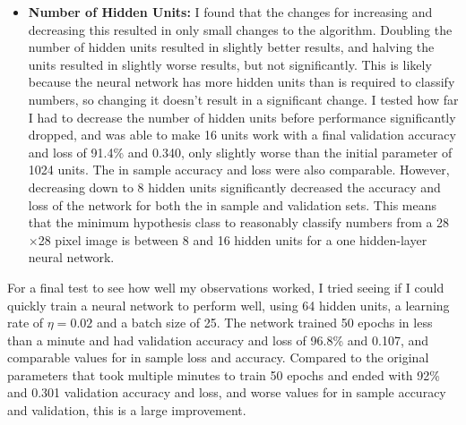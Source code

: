 \documentclass{article}
\begin{document}
\begin{itemize}
	\item \textbf{Number of Hidden Units:} I found that the changes for increasing and decreasing this resulted in only small changes to the algorithm. Doubling the number of hidden units resulted in slightly better results, and halving the units resulted in slightly worse results, but not significantly. This is likely because the neural network has more hidden units than is required to classify numbers, so changing it doesn't result in a significant change. I tested how far I had to decrease the number of hidden units before performance significantly dropped, and was able to make 16 units work with a final validation accuracy and loss of 91.4\% and 0.340, only slightly worse than the initial parameter of 1024 units. The in sample accuracy and loss were also comparable. However, decreasing down to 8 hidden units significantly decreased the accuracy and loss of the network for both the in sample and validation sets. This means that the minimum hypothesis class to reasonably classify numbers from a 28$\times$28 pixel image is between 8 and 16 hidden units for a one hidden-layer neural network. 
\end{itemize}
For a final test to see how well my observations worked, I tried seeing if I could quickly train a neural network to perform well, using 64 hidden units, a learning rate of $\eta = 0.02$ and a batch size of 25. The network trained 50 epochs in less than a minute and had validation accuracy and loss of 96.8\% and 0.107, and comparable values for in sample loss and accuracy. Compared to the original parameters that took multiple minutes to train 50 epochs and ended with 92\% and 0.301 validation accuracy and loss, and worse values for in sample accuracy and validation, this is a large improvement. 
\end{document}
